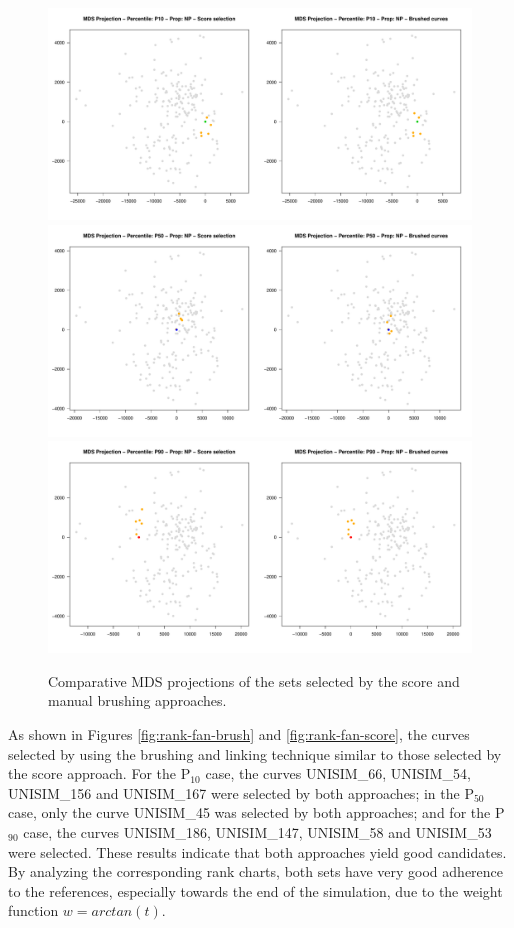 \documentclass[final,5p,times,twocolumn]{elsarticle}
\begin{document}
\begin{figure}[H]
  \centering
  \includegraphics[width=0.88\columnwidth]{figures/mds-brush-score-p10.pdf}
  \includegraphics[width=0.88\columnwidth]{figures/mds-brush-score-p50.pdf}
  \includegraphics[width=0.88\columnwidth]{figures/mds-brush-score-p90.pdf}
  \caption{Comparative MDS projections of the sets selected by the score and manual brushing approaches.}
  \label{fig:mds-plots}
\end{figure}

As shown in Figures \ref{fig:rank-fan-brush} and \ref{fig:rank-fan-score}, the curves selected by using the brushing and linking technique similar to those selected by the score approach. For the P$_{10}$ case, the curves UNISIM\_66, UNISIM\_54, UNISIM\_156 and UNISIM\_167 were selected by both approaches; in the P$_{50}$ case, only the curve UNISIM\_45 was selected by both approaches; and for the P$_{90}$ case, the curves UNISIM\_186, UNISIM\_147, UNISIM\_58 and UNISIM\_53 were selected. These results indicate that both approaches yield good candidates. By analyzing the corresponding rank charts, both sets have very good adherence to the references, especially towards the end of the simulation, due to the weight function $w = arctan(t)$. 
\end{document}
